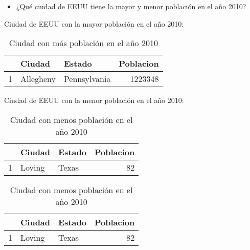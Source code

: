 \begin{itemize}
\item ¿Qué ciudad de EEUU tiene la mayor y menor población en el año 2010?
\end{itemize}


Ciudad de EEUU con la mayor población en el año 2010:
\begin{table}[ht]
\centering
\begin{tabular}{rllr}
  \hline
 & Ciudad & Estado & Poblacion \\ 
  \hline
1 & Allegheny & Pennsylvania & 1223348 \\ 
   \hline
\end{tabular}
\caption{Ciudad con más población en el año 2010} 
\end{table}

\vspace{-6mm}
Ciudad de EEUU con la menor población en el año 2010:

\begin{table}[ht]
\centering
\begin{tabular}{rllr}
  \hline
 & Ciudad & Estado & Poblacion \\ 
  \hline
1 & Loving & Texas &  82 \\ 
   \hline
\end{tabular}
\caption{Ciudad con menos población en el año 2010} 
\end{table}

\begin{kframe}
\begin{alltt}
   \hlkwb{<-} \hlopt{$}\hlopt{==}\hlopt{$}
         \hlkwb{<-} \hlstd{(}\hlopt{$} \hlopt{$} \hlopt{$}
        \hlstd{)}
\end{alltt}
\end{kframe}%
\begin{table}[ht]
\centering
\begin{tabular}{rllr}
  \hline
 & Ciudad & Estado & Poblacion \\ 
  \hline
1 & Loving & Texas &  82 \\ 
   \hline
\end{tabular}
\caption{Ciudad con menos población en el año 2010} 
\end{table}


